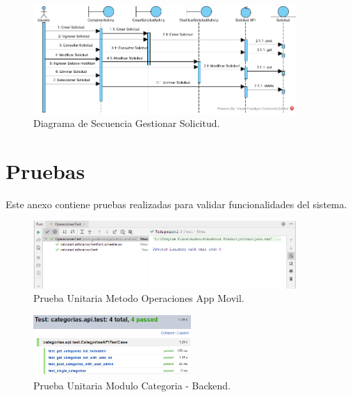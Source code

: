 \documentclass[12pt,letterpaper,openany]{book}
\begin{document}
\begin{figure}[H]
\begin{center}
\includegraphics[width=10cm]{./imagenes/DS/DS_gestionar_solicitud}
\caption{Diagrama de Secuencia Gestionar Solicitud.}
\end{center}
\end{figure}
\chapter{Pruebas}\label{aped.D}
Este anexo contiene pruebas realizadas para validar funcionalidades del sistema.	
\begin{figure}[H]
\begin{center}
\includegraphics[width=10cm]{./imagenes/Test/OperacionesTest}
\caption{Prueba Unitaria Metodo Operaciones App Movil.}
\end{center}
\end{figure}

\begin{figure}[H]
\begin{center}
\includegraphics[width=6cm]{./imagenes/Test/Backend/Test__categorias_api_test}
\caption{Prueba Unitaria Modulo Categoria - Backend.}
\end{center}
\end{figure}
\end{document}
